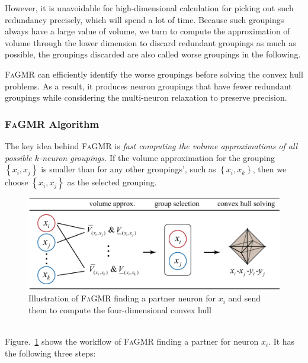 \documentclass[runningheads]{llncs}
\newcommand{\ourtool}{\textsc{FaGMR}\xspace}
\begin{document}
However, it is unavoidable for high-dimensional calculation for picking out such redundancy precisely, which will spend a lot of time. Because such groupings always have a large value of volume, we turn to compute the approximation of volume through the lower dimension to discard redundant groupings as much as possible, the groupings discarded are also called worse groupings in the following.

\ourtool can efficiently identify the worse groupings before solving the convex hull problems.
As a result, it produces neuron groupings that have fewer redundant groupings while considering the multi-neuron relaxation to preserve precision.


%
%
%
\subsubsection{\ourtool Algorithm}
The key idea behind \ourtool is \emph{fast computing the volume approximations of all possible
$k$-neuron groupings.}
If the volume approximation for the grouping $\left\{x_{i},x_{j}\right\}$ is smaller than for 
any other groupings', such as $\left\{x_{i},x_{k}\right\}$,
then we choose $\left\{x_{i},x_{j}\right\}$ as the selected grouping.
\begin{figure}[ht]
	\vskip 0.2in
	\begin{center}
	\includegraphics[width=\linewidth]{figures/workflow.eps}
	\caption{Illustration of \ourtool finding a partner neuron for $x_{i}$ and send them
	to compute the four-dimensional convex hull}
	\label{FigR1_0}
	\end{center}
	\vskip -0.2in
\end{figure}\\
Figure.~\ref{FigR1_0} shows the workflow of \ourtool finding a partner for neuron $x_{i}$.
It has the following three steps:
\end{document}
